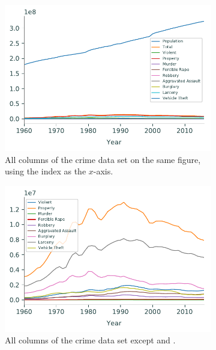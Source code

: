 \begin{figure}[H] %
\captionsetup[subfigure]{justification=centering}
\centering
\begin{subfigure}{.49\textwidth}
    \includegraphics[width=\textwidth]{figures/all_crime.pdf}
    \caption{All columns of the crime data set on the same figure, using the index as the $x$-axis.}
    \label{fig:crime-all}
\end{subfigure}
%
\begin{subfigure}{.49\textwidth}
    \includegraphics[width=\textwidth]{figures/all_crime2.pdf}
    \caption{All columns of the crime data set except  and .}
    \label{fig:crime-all-v2}
\end{subfigure}
\caption{}
\end{figure}

